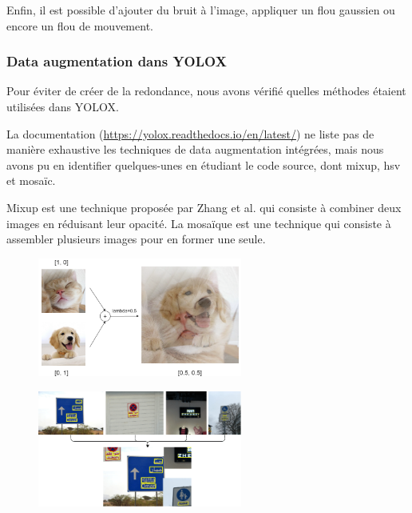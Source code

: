 Enfin, il est possible d'ajouter du bruit à l'image, appliquer un flou gaussien ou encore un flou de mouvement.

\subsubsection{Data augmentation dans YOLOX}

Pour éviter de créer de la redondance, nous avons vérifié quelles méthodes étaient utilisées dans YOLOX. 

La documentation (\url{https://yolox.readthedocs.io/en/latest/}) ne liste pas de manière
exhaustive les techniques de data augmentation intégrées, mais nous avons pu en identifier quelques-unes
en étudiant le code source, dont mixup, hsv et mosaïc.

Mixup est une technique proposée par Zhang et al. \cite{Zhang_Cisse_Dauphin_Lopez-Paz_2018} qui consiste à combiner
deux images en réduisant leur opacité. La mosaïque est une technique qui consiste à assembler plusieurs images pour en former une seule.

\begin{figure}[H]
    \centering
    \begin{minipage}{.5\textwidth}
      \centering
      \includegraphics[width=0.6\textwidth]{./img/mixup_augmentation.png}
      \label{fig:test1}
    \end{minipage}%
    \begin{minipage}{.5\textwidth}
      \centering
      \includegraphics[width=0.6\textwidth]{./img/mosaic_augmentation.png}
      \label{fig:test2}
    \end{minipage}
\end{figure}

